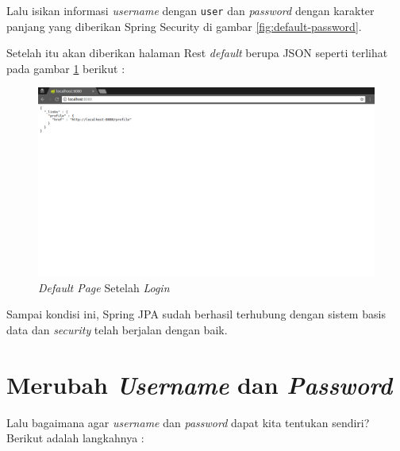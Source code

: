 Lalu isikan informasi \textit{username} dengan \texttt{user} dan \textit{password} dengan karakter panjang yang diberikan Spring Security di gambar \ref{fig:default-password}.

Setelah itu akan diberikan halaman Rest \textit{default} berupa JSON seperti terlihat pada gambar \ref{fig:index-default} berikut :

\begin{figure}[H]
	\centering
	\includegraphics[width=1\textwidth]{./resources/019-default-index}
	\caption{\textit{Default Page} Setelah \textit{Login}}
	\label{fig:index-default}
\end{figure}

Sampai kondisi ini, Spring JPA sudah berhasil terhubung dengan sistem basis data dan \textit{security} telah berjalan dengan baik.

\section{Merubah \textit{Username} dan \textit{Password}}

Lalu bagaimana agar \textit{username} dan \textit{password} dapat kita tentukan sendiri? Berikut adalah langkahnya :

